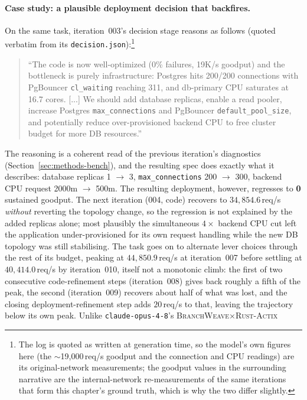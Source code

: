 \paragraph{Case study: a plausible deployment decision that backfires.}
On the same task, iteration~003's decision stage reasons as follows
(quoted verbatim from its \texttt{decision.json}):\footnote{The log is
quoted as written at generation time, so the model's own figures here
(the $\sim$19{,}000\,req/s goodput and the connection and CPU readings)
are its original-network measurements; the goodput values in the
surrounding narrative are the internal-network re-measurements of the same
iterations that form this chapter's ground truth, which is why the two
differ slightly.}
\begin{quote}
\small
``The code is now well-optimized (0\% failures, 19K/s goodput) and the
bottleneck is purely infrastructure: Postgres hits 200/200 connections
with PgBouncer \texttt{cl\_waiting} reaching 311, and db-primary CPU
saturates at 16.7 cores. [...] We should add database replicas, enable a
read pooler, increase Postgres \texttt{max\_connections} and PgBouncer
\texttt{default\_pool\_size}, and potentially reduce over-provisioned
backend CPU to free cluster budget for more DB resources.''
\end{quote}
The reasoning is a coherent read of the previous iteration's diagnostics
(Section~\ref{sec:methods-bench}), and the resulting spec does exactly
what it describes: database replicas 1 $\to$ 3, \texttt{max\_connections}
200 $\to$ 300, backend CPU request 2000m $\to$ 500m. The resulting
deployment, however, regresses to \textbf{0} sustained goodput. The next
iteration (004, code) recovers to $34{,}854.6$\,req/s \emph{without}
reverting the topology change, so the regression is not explained by the
added replicas alone; most plausibly the simultaneous $4\times$ backend
CPU cut left the application under-provisioned for its own request
handling while the new DB topology was still stabilising. The task goes
on to alternate lever choices through the rest of its budget, peaking at
$44{,}850.9$\,req/s at iteration~007 before settling at $40{,}414.0$\,req/s
by iteration~010, itself not a monotonic climb: the first of two
consecutive code-refinement steps (iteration~008) gives back roughly a
fifth of the peak, the second (iteration~009) recovers about half of what
was lost, and the closing deployment-refinement step adds $20$\,req/s to that, leaving the
trajectory below its own peak. Unlike
\texttt{claude-opus-4-8}'s \textsc{BranchWeave}$\times$\textsc{Rust-Actix}
